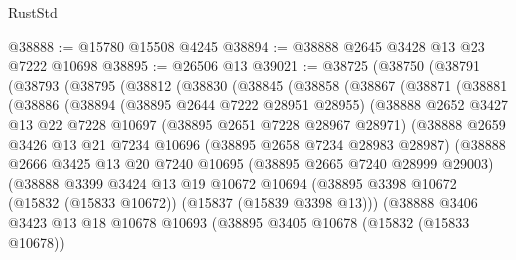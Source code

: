 \begin{lexlean}{RustStd}
\begin{coremodule}
{\begin{coremodule}
{{{{{{{{{{{{{{{{{{{{{{{{{{{{{{{{{{{{{{{{{{{{{{{{{{{{{{{{{{{{@38888 := @15780 @15508 @4245
@38894 := @38888 @2645 @3428 @13 @23 @7222 @10698
@38895 := @26506 @13
@39021 := @38725
    (@38750
      (@38791
        (@38793
          (@38795
            (@38812
              (@38830
                (@38845
                  (@38858
                    (@38867
                      (@38871
                        (@38881
                          (@38886
                            (@38894
                              (@38895 @2644 @7222 @28951 @28955)
                              (@38888
                                @2652
                                @3427
                                @13
                                @22
                                @7228
                                @10697
                                (@38895 @2651 @7228 @28967 @28971)
                                (@38888
                                  @2659
                                  @3426
                                  @13
                                  @21
                                  @7234
                                  @10696
                                  (@38895 @2658 @7234 @28983 @28987)
                                  (@38888
                                    @2666
                                    @3425
                                    @13
                                    @20
                                    @7240
                                    @10695
                                    (@38895 @2665 @7240 @28999 @29003)
                                    (@38888
                                      @3399
                                      @3424
                                      @13
                                      @19
                                      @10672
                                      @10694
                                      (@38895
                                        @3398
                                        @10672
                                        (@15832 (@15833 @10672))
                                        (@15837 (@15839 @3398 @13)))
                                      (@38888
                                        @3406
                                        @3423
                                        @13
                                        @18
                                        @10678
                                        @10693
                                        (@38895
                                          @3405
                                          @10678
                                          (@15832 (@15833 @10678))
}}}}}}}}}}}}}}}}}}}}}}}}}}}}}}}}}}}}}}}}}}}}}}}}}}}}}}}}}}}}
\end{coremodule}}
\end{coremodule}
\end{lexlean}

